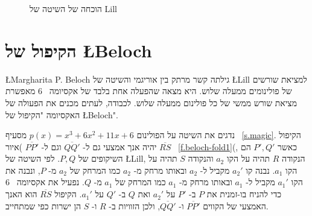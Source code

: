 \begin{figure}[tb]
\begin{center}
\end{center}
\caption{הוכחה של השיטה של Lill}\label{f.lill-proof}
\end{figure}






\section{%
הקיפול של
\L{Beloch}}\label{s.beloch-fold}

\L{Margharita P. Beloch}
גילתה קשר מרתק בין אוריגמי והשיטה של
\L{Lill}
למציאת שורשים של פולינומים ממעלה שלוש. היא מצאה שהפעלה אחת בלבד של אקסיומה%
~$6$
מאפשרת מציאת שורש ממשי של כל פולינום ממעלה שלוש. לכבודה, לעתים מכנים את הפעולה של האקסיומה "הקיפול של
\L{Beloch}".

נדגים את השיטה על הפולינום
$p(x)=x^3+6x^2+11x+6$
מסעיף%
~\ref{s.magic}.
הקיפול
$\overline{RS}$
יהיה אנך אמצעי גם ל-%
$\overline{QQ'}$
וגם ל-%
$\overline{PP'}$
)איור~%
\ref{f.beloch-fold1}(,
כאשר 
$P',Q'$
הם השיקופים של
$P,Q$.
לפי השיטה של
\L{Lill},
הנקודה
$R$
תהיה על הקו
$a_2$
והנקודה
$S$
תהיה על הקו
$a_1$.
נבנה קו
$a_2'$
מקביל ל-%
$a_2$
ובאותו מרחק מ-%
$a_2$
כמו המרחק של
$a_2$
מ-%
$P$,
ונבנה את הקו
$a_1'$
מקביל ל-%
$a_1$
ובאותו מרחק מ-%
$a_1$
כמו המרחק של
$a_1$
מ-%
$Q$.
נפעיל את אקסיומה%
~$6$
כדי להניח בו-זמנית את 
$P$
ב-%
$P'$
על 
$a_2'$
ואת 
$Q$
ב-%
$Q'$
על
$a_1'$.
הקיפול 
$\overline{RS}$
הוא האנך האמצעי של הקווים
$\overline{PP'}$
ו-%
$\overline{QQ'}$,
ולכן הזוויות ב-%
$R$
ו-%
$S$
הן ישרות כפי שמתחייב.



